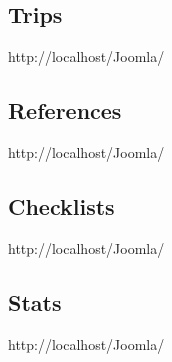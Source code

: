 \documentclass[8pt]{article} %
\begin{document}
\subsection{Trips}
http://localhost/Joomla/
\subsection{References}
http://localhost/Joomla/
\subsection{Checklists}			
http://localhost/Joomla/
\subsection{Stats}
http://localhost/Joomla/
\end{document}
